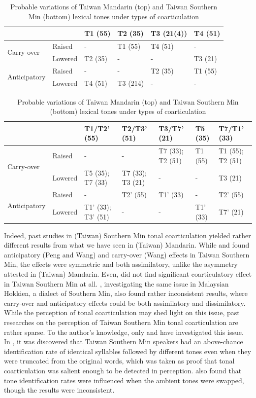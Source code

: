 \documentclass[12pt]{report}
\begin{document}
\begin{CJK}{UTF8}{bsmi}
\begin{flushleft}
\begin{table}[hbt!]
\begin{tabularx}{\textwidth}{|l|l||X|X|X|X|}
\hline
 & & T1 (55) & T2 (35) & T3 (21(4)) & T4 (51)\\
 \hline
 \hline
\multirow{2}{*}{Carry-over} & Raised & - & T1 (55) & T4 (51) & -\\
& Lowered & T2 (35) & - & - & T3 (21)\\
\hline
\multirow{2}{*}{Anticipatory} & Raised & - & - & T2 (35) & T1 (55) \\
& Lowered & T4 (51) & T3 (214) & - & -\\
\hline
\end{tabularx}
\break
\break
\begin{tabularx}{\textwidth}{|l|l||X|X|X|X|X|}
\hline
 & & T1/T2' (55) & T2/T3' (51) & T3/T7' (21) & T5 (35) & T7/T1' (33)\\
 \hline
 \hline
\multirow{2}{*}{Carry-over} & Raised & - & - & T7 (33); T2 (51) & T1 (55) & T1 (55); T2 (51)\\
& Lowered & T5 (35); T7 (33) & T7 (33); T3 (21) & - & - & T3 (21)\\
\hline
\multirow{2}{*}{Anticipatory} & Raised & - & T2' (55) & T1' (33) & - & T2' (55) \\
& Lowered & T1' (33); T3' (51) & - & - & T1' (33) & T7' (21)\\
\hline
\end{tabularx}
\caption{Probable variations of Taiwan Mandarin (top) and Taiwan Southern Min (bottom) lexical tones under types of coarticulation}
\label{table:Probablevariations}
\end{table}
\end{flushleft}

Indeed, past studies in (Taiwan) Southern Min tonal coarticulation yielded rather different results from what we have seen in (Taiwan) Mandarin. While \cite{Peng1997} and \cite{Wang2002} found anticipatory (Peng and Wang) and carry-over (Wang) effects in Taiwan Southern Min, the effects were symmetric and both assimilatory, unlike the asymmetry attested in (Taiwan) Mandarin. Even, \cite{Lin1988} did not find significant coarticulatory effect in Taiwan Southern Min at all. \cite{ChangHsieh2012}, investigating the same issue in Malaysian Hokkien, a dialect of Southern Min, also found rather inconsistent results, where carry-over and anticipatory effects could be both assimilatory and dissimilatory. While the perception of tonal coarticulation may shed light on this issue, past researches on the perception of Taiwan Southern Min tonal coarticulation are rather sparse. To the author's knowledge, only \cite{Peng1997} and \cite{Wang2002} have investigated this issue. In \cite{Peng1997}, it was discovered that Taiwan Southern Min speakers had an above-chance identification rate of identical syllables followed by different tones even when they were truncated from the original words, which was taken as proof that tonal coarticulation was salient enough to be detected in perception. \cite{Wang2002} also found that tone identification rates were influenced when the ambient tones were swapped, though the results were inconsistent.


\end{CJK}
\end{document}
